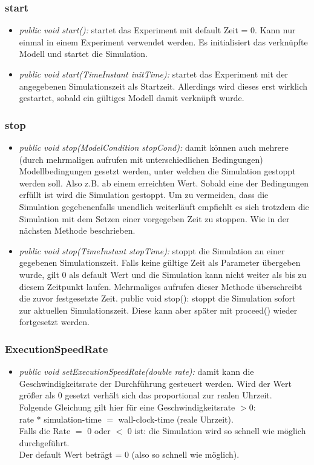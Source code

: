 \documentclass[runningheads]{llncs}
\begin{document}
\subsubsection{start}
\begin{itemize}
\item \textit{public void start():} startet das Experiment mit default Zeit = 0. Kann nur einmal in einem Experiment verwendet werden. Es initialisiert das verknüpfte Modell und startet die Simulation.
\item \textit{public void start(TimeInstant initTime):} startet das Experiment mit der angegebenen Simulationszeit als Startzeit. Allerdings wird dieses erst wirklich gestartet, sobald ein gültiges Modell damit verknüpft wurde.
\end{itemize}

\subsubsection{stop}
\begin{itemize}
\item \textit{public void stop(ModelCondition stopCond):} damit können auch mehrere (durch mehrmaligen aufrufen mit unterschiedlichen Bedingungen) Modellbedingungen gesetzt werden, unter welchen die Simulation gestoppt werden soll. Also z.B. ab einem erreichten Wert. Sobald eine der Bedingungen erfüllt ist wird die Simulation gestoppt. Um zu vermeiden, dass die Simulation gegebenenfalls unendlich weiterläuft empfiehlt es sich trotzdem die Simulation mit dem Setzen einer vorgegeben Zeit zu stoppen. Wie in der nächsten Methode beschrieben.
\item \textit{public void stop(TimeInstant stopTime):} stoppt die Simulation an einer gegebenen Simulationszeit. Falls keine gültige Zeit als Parameter übergeben wurde, gilt 0 als default Wert und die Simulation kann nicht weiter als bis zu diesem Zeitpunkt laufen. Mehrmaliges aufrufen dieser Methode überschreibt die zuvor festgesetzte Zeit.
public void stop(): stoppt die Simulation sofort zur aktuellen Simulationszeit. Diese kann aber später mit proceed() wieder fortgesetzt werden.
\end{itemize}

\subsubsection{ExecutionSpeedRate}
\begin{itemize}
\item \textit{public void setExecutionSpeedRate(double rate):} damit kann die Geschwindigkeitsrate der Durchführung gesteuert werden. Wird der Wert größer als 0 gesetzt verhält sich das proportional zur realen Uhrzeit. \\
Folgende Gleichung gilt hier für eine Geschwindigkeitsrate $> 0:$ \\
rate $*$ simulation-time $=$ wall-clock-time (reale Uhrzeit).\\
Falls die Rate $=$ 0 oder $<$ 0 ist: die Simulation wird so schnell wie möglich durchgeführt. \\
Der default Wert beträgt = 0 (also so schnell wie möglich).\\
\end{itemize}
\end{document}
